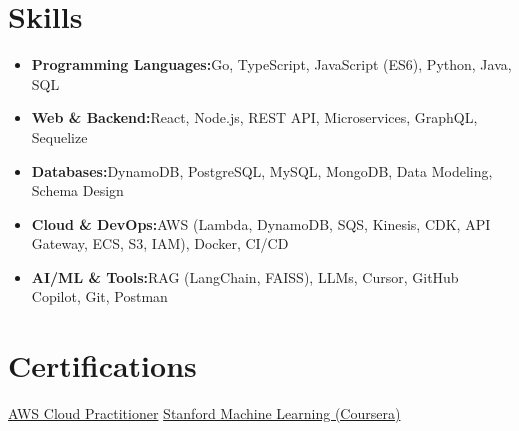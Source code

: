 \documentclass[a4paper,10pt]{article}
\newcommand{\resumeItem}[2]{\item{\textbf{#1}{\hspace{0.5mm}#2 \vspace{-0.5mm}}}}
\newcommand{\resumeSubItem}[2]{\resumeItem{#1}{#2}\vspace{-3pt}}
\newcommand{\resumeHeadingSkillStart}{\begin{itemize}[leftmargin=*, itemsep=0.6mm, rightmargin=2ex]}
\newcommand{\resumeHeadingSkillEnd}{\end{itemize}\vspace{-2mm}}
\begin{document}
\section{\textbf{Skills}}
\resumeHeadingSkillStart
\resumeSubItem{Programming Languages:}{Go, TypeScript, JavaScript (ES6), Python, Java, SQL}
\resumeSubItem{Web \& Backend:}{React, Node.js, REST API, Microservices, GraphQL, Sequelize}
\resumeSubItem{Databases:}{DynamoDB, PostgreSQL, MySQL, MongoDB, Data Modeling, Schema Design}
\resumeSubItem{Cloud \& DevOps:}{AWS (Lambda, DynamoDB, SQS, Kinesis, CDK, API Gateway, ECS, S3, IAM), Docker, CI/CD}
\resumeSubItem{AI/ML \& Tools:}{RAG (LangChain, FAISS), LLMs, Cursor, GitHub Copilot, Git, Postman}
\resumeHeadingSkillEnd
\vspace{0mm}

\section{\textbf{Certifications}}
\footnotesize{
\href{https://drive.google.com/file/d/1a3exoiS79RS3q8vSJHT-PpkczSPg54EZ/view}{AWS Cloud Practitioner} \hfill \href{https://drive.google.com/file/d/1At3BLkqJ9vuhPPUCcrNAw9yNH5li7XdQ/view}{Stanford Machine Learning (Coursera)}
}
\end{document}
